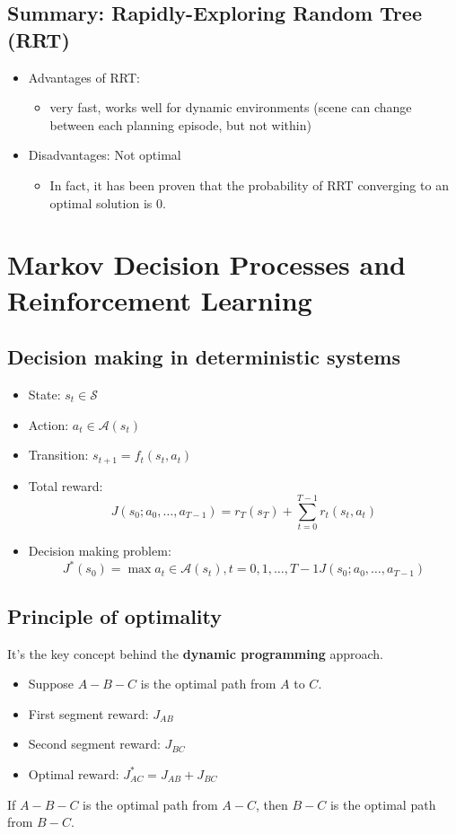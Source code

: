 \documentclass[10pt]{article}
\begin{document}
\subsection*{Summary: Rapidly-Exploring Random Tree (RRT)}
\begin{itemize}
	\item Advantages of RRT:
	\begin{itemize}
        \item very fast, works well for dynamic environments (scene can change between each planning episode, but not within)
    \end{itemize}
	\item Disadvantages: Not optimal
	\begin{itemize}
        \item In fact, it has been proven that the probability of RRT converging to an optimal solution is 0.
    \end{itemize}
\end{itemize}

\section*{Markov Decision Processes and Reinforcement Learning}
\subsection*{Decision making in deterministic systems}
\begin{itemize}
	\item State: $s_t \in \mathcal{S}$
	\item Action: $a_t \in \mathcal{A}(s_t)$
	\item Transition: $s_{t + 1} = f_t(s_t, a_t)$
	\item Total reward: 
    \[J(s_0; a_0, \dots, a_{T - 1}) = r_T(s_T) + \sum_{t = 0}^{T - 1} r_t(s_t, a_t)\]
    \item Decision making problem:
    \[J^*(s_0) = \max{a_t \in \mathcal{A}(s_t), t=0, 1, \dots, T - 1} J(s_0; a_0, \dots, a_{T - 1})\]
\end{itemize}

\subsection*{Principle of optimality}
It's the key concept behind the \textbf{dynamic programming} approach.
\begin{itemize}
	\item Suppose $A - B - C$ is the optimal path from $A$ to $C$.
	\item First segment reward: $J_{AB}$
	\item Second segment reward: $J_{BC}$
	\item Optimal reward: $J_{AC}^* = J_{AB} + J_{BC}$
\end{itemize}
If $A - B - C$ is the optimal path from $A - C$, then $B-C$ is the optimal path from $B - C$.
\end{document}
